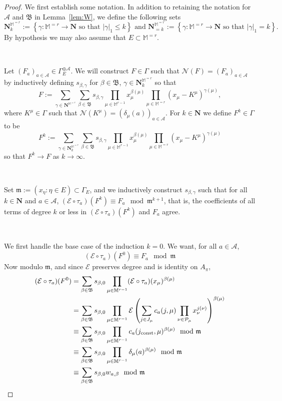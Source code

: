 \documentclass[10pt]{amsart}
\theoremstyle{Theorem}
\theoremstyle{definition}
\newcommand{\NN}{\mathbf N}
\newcommand{\fm}{\mathfrak{m}}
\newcommand{\cA}{\mathcal{A}}
\newcommand{\cE}{\mathcal{E}}
\def\cs{s}
\def\cN{\mathcal{N}}
\begin{document}
\begin{proof}

	 We first establish some notation. In addition to retaining the notation for $\mathcal{A}$ and $\mathfrak{B}$ in Lemma~\ref{lem:W}, we define the following sets
$$\NN_{k}^{\mathbb{M}^{=r}} := \left\{ \gamma \colon \mathbb{M}^{=r} \to \NN \textrm{ so that } |\gamma|_1 \leq k\right \} \textrm{ and } 
\NN_{=k}^{\mathbb{M}^{=r}} := \left\{ \gamma \colon \mathbb{M}^{=r} \to \NN \textrm{ so that } |\gamma|_1 = k\right \}.$$
By hypothesis we may also assume that $E\subset \mathbb{M}^{=r}$.

\ 

Let $(F_a)_{a\in\cA}\in \Gamma_E^{\oplus \cA}$.  We will construct $F\in \Gamma$ such that $\cN(F) = (F_a)_{a\in\cA}$ by inductively defining $s_{\beta,\gamma}$ for $\beta\in \mathfrak{B}$, $\gamma\in \NN_{k}^{\mathbb{M}^{=r}}$ so that
\[F := \sum_{\gamma\in \NN^{\mathbb{M}^{=r}}}\sum_{\beta \in \mathfrak{B}} \cs_{\beta,\gamma} \prod_{\mu \in \mathbb{M}^{r-1}} x_\mu^{\beta(\mu)}\prod_{\mu \in \mathbb{M}^{=r}} (x_\mu - K^\mu)^{\gamma(\mu)},\]
where $K^\mu\in \Gamma$ such that $\cN(K^\mu) = (\delta_\mu(a))_{a\in \cA}$.
For $k\in \NN$ we define $F^k\in \Gamma$ to be
\[F^k := \sum_{\gamma\in \NN_k^{\mathbb{M}^{=r}}}\sum_{\beta \in \mathfrak{B}} \cs_{\beta,\gamma} \prod_{\mu \in \mathbb{M}^{r-1}} x_\mu^{\beta(\mu)}\prod_{\mu \in \mathbb{M}^{=r}} (x_\mu - K^\mu)^{\gamma(\mu)}\]
 so that $F^k\to F$ as $k\to \infty$. 

\ 

Set $\fm := (x_\eta \colon \eta \in E)\subset \Gamma_E$, and we inductively construct $s_{\beta,\gamma}$ such that for all $k\in\NN$ and $a\in\cA$, $(\cE\circ \tau_a)(F^k) \equiv F_a \mod \fm^{k+1}$, that is, the coefficients of all terms of degree $k$ or less in $(\cE\circ \tau_a)(F^k)$ and $F_a$ agree.  

\ 

We first handle the base case of the induction $k=0$. We want, for all $a\in\cA$, 
$$(\cE\circ\tau_a)(F^0) \equiv F_a\mod \fm$$
Now modulo $\fm$, and since $\cE$ preserves degree and is identity on $A_\pi$,
\begin{align*}
	(\cE\circ\tau_a)(F^0) & = \sum_{\beta \in \mathfrak{B}} \cs_{\beta,0} \prod_{\mu \in \mathbb{M}^{r-1}} (\cE\circ \tau_a)(x_\mu)^{\beta(\mu)}\\ 
	& = \sum_{\beta \in \mathfrak{B}} \cs_{\beta,0} \prod_{\mu \in \mathbb{M}^{r-1}} \cE\left(\sum_{j\in J_\mu} c_a(j,\mu)\prod_{\nu\in\mathcal{P}_\mu}x_{\nu}^{j(\nu)}\right)^{\beta(\mu)}\\ 
	&\equiv \sum_{\beta \in \mathfrak{B}} \cs_{\beta,0} \prod_{\mu \in \mathbb{M}^{r-1}}c_a(j_\textup{const},\mu)^{\beta(\mu)} \mod \fm \\ 
	&\equiv \sum_{\beta \in \mathfrak{B}} \cs_{\beta,0} \prod_{\mu \in \mathbb{M}^{r-1}} \delta_\mu(a)^{\beta(\mu)}\mod \fm \\
	&\equiv \sum_{\beta \in \mathfrak{B}} \cs_{\beta,0}w_{a,\beta} \mod \fm
\end{align*}




\end{proof}
\end{document}
